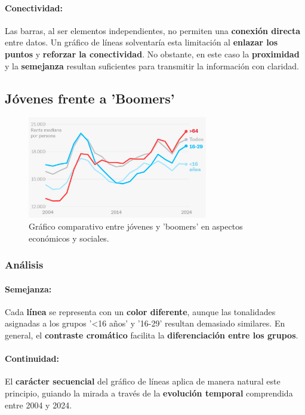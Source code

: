 \documentclass[12pt,a4paper]{article}
\begin{document}
\paragraph{Conectividad:}
Las barras, al ser elementos independientes, no permiten una \textbf{conexión directa} entre datos. Un gráfico de líneas solventaría esta limitación al \textbf{enlazar los puntos} y \textbf{reforzar la conectividad}. No obstante, en este caso la \textbf{proximidad} y la \textbf{semejanza} resultan suficientes para transmitir la información con claridad.

\newpage

\subsection{Jóvenes frente a 'Boomers'}
\begin{figure}[h]
    \centering
    \includegraphics[width=0.7\textwidth]{graf2.png}
    \caption{Gráfico comparativo entre jóvenes y 'boomers' en aspectos económicos y sociales.}
    \label{fig:graf2}
\end{figure}
\subsubsection{Análisis}

\paragraph{Semejanza:}
Cada \textbf{línea} se representa con un \textbf{color diferente}, aunque las tonalidades asignadas a los grupos '<16 años' y '16-29' resultan demasiado similares. En general, el \textbf{contraste cromático} facilita la \textbf{diferenciación entre los grupos}.

\paragraph{Continuidad:}
El \textbf{carácter secuencial} del gráfico de líneas aplica de manera natural este principio, guiando la mirada a través de la \textbf{evolución temporal} comprendida entre 2004 y 2024.
\end{document}
